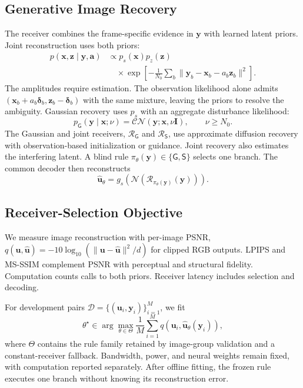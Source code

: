 \documentclass[conference]{IEEEtran}
\newcommand{\norm}[1]{\lVert#1\rVert}
\newcommand{\G}{\mathsf{G}}
\newcommand{\SIC}{\mathsf{S}}
\begin{document}
\subsection{Generative Image Recovery}
The receiver combines the frame-specific evidence in $\bm y$ with learned
latent priors. Joint reconstruction uses both priors:
\begin{equation}
 \begin{split}
 p(\bm x,\bm z\mid\bm y,\bm a)&\propto p_s(\bm x)p_z(\bm z)\\
 &\quad\times\exp\!\left[-\frac{1}{N_0}\sum_b
 \norm{\bm y_b-\bm x_b-a_b\bm z_b}^{2}\right].
 \end{split}
 \label{eq:joint}
\end{equation}
The amplitudes require estimation. The observation likelihood alone admits
$(\bm x_b+a_b\bm\delta_b,\bm z_b-\bm\delta_b)$ with the same mixture, leaving
the priors to resolve the ambiguity. Gaussian recovery uses $p_s$ with
an aggregate disturbance likelihood:
\begin{equation}
 p_{\G}(\bm y\mid\bm x;\nu)=
 \mathcal{CN}(\bm y;\bm x,\nu\bm I),\qquad \nu\ge N_0 .
 \label{eq:gaussian}
\end{equation}
The Gaussian and joint receivers, $\mathcal R_{\G}$ and $\mathcal R_{\SIC}$,
use approximate diffusion recovery with observation-based initialization or
guidance. Joint recovery also estimates the interfering latent. A blind rule
$\pi_\theta(\bm y)\in\{\G,\SIC\}$ selects one branch.
The common decoder then reconstructs
\begin{equation}
 \widehat{\bm u}_\theta
 =g_s\!\left(\mathcal N\!\left(\mathcal R_{\pi_\theta(\bm y)}(\bm y)\right)\right).
 \label{eq:decode}
\end{equation}

\subsection{Receiver-Selection Objective}
We measure image reconstruction with per-image PSNR, $q(\bm u,\widehat{\bm u})=
-10\log_{10}(\|\bm u-\widehat{\bm u}\|^2/d)$ for clipped RGB outputs.
LPIPS and MS-SSIM complement PSNR with perceptual and structural fidelity.
Computation counts calls to both priors. Receiver latency includes selection
and decoding.

For development pairs $\mathcal D=\{(\bm u_i,\bm y_i)\}_{i=1}^{M}$, we fit
\begin{equation}
 \theta^\star\in\arg\max_{\theta\in\Theta}
 \frac{1}{M}\sum_{i=1}^{M}q(\bm u_i,\widehat{\bm u}_\theta(\bm y_i)),
 \label{eq:objective}
\end{equation}
where $\Theta$ contains the rule family retained by image-group validation and
a constant-receiver fallback. Bandwidth, power, and neural weights remain
fixed, with computation reported separately. After offline fitting,
the frozen rule executes one branch without knowing its reconstruction error.
\end{document}
